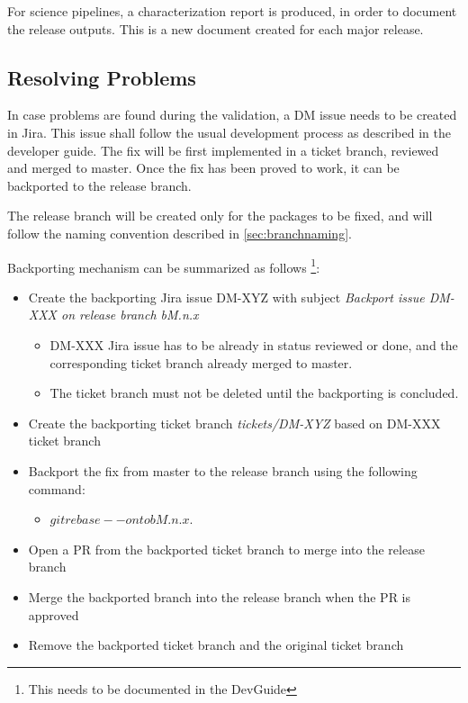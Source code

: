 For science pipelines, a characterization report is produced, in order to document the release outputs.
This is a new document created for each major release.


\subsection{Resolving Problems}

In case problems are found during the validation, a DM issue needs to be created in Jira.
This issue shall follow the usual development process as described in the developer guide.
The fix will be first implemented in a ticket branch, reviewed and merged to master.
Once the fix has been proved to work, it can be backported to the release branch.

The release branch will be created only for the packages to be fixed, and will follow the naming convention described in \ref{sec:branchnaming}.

Backporting mechanism can be summarized as follows \footnote{This needs to be documented in the DevGuide}:


\begin{itemize}
\item Create the backporting Jira issue DM-XYZ with subject \textit{Backport issue DM-XXX on release branch bM.n.x}
  \begin{itemize}
  \item DM-XXX Jira issue has to be already in status reviewed or done, and the corresponding ticket branch already merged to master. 
  \item The ticket branch must not be deleted  until the backporting is concluded.
  \end{itemize}
\item Create the backporting ticket branch \textit{tickets/DM-XYZ}  based on DM-XXX ticket branch
\item Backport the fix from master to the release branch using the following command: 
  \begin{itemize}
   \item $git rebase --onto bM.n.x$.
  \end{itemize}
\item Open a PR from the backported ticket branch to merge into the release branch
\item Merge the backported branch into the release branch when the PR is approved
\item Remove the backported ticket branch and the original ticket branch
\end{itemize}

